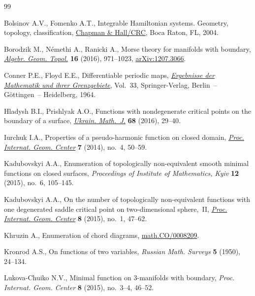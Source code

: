 \begin{thebibliography}{99}
\footnotesize\itemsep=0pt

Bolsinov A.V., Fomenko A.T., Integrable {H}amiltonian systems. Geometry,
 topology, classif\/ication, \href{https://doi.org/10.1201/9780203643426}{Chapman \& Hall/CRC}, Boca Raton, FL, 2004.

Borodzik M., N\'emethi A., Ranicki A., Morse theory for manifolds with
 boundary, \href{https://doi.org/10.2140/agt.2016.16.971}{\textit{Algebr. Geom. Topol.}} \textbf{16} (2016), 971--1023,
 \href{https://arxiv.org/abs/1207.3066}{arXiv:1207.3066}.

Conner P.E., Floyd E.E., Dif\/ferentiable periodic maps, \href{https://doi.org/10.1007/978-3-662-41633-4}{\textit{Ergebnisse der
 Mathematik und ihrer Grenzgebiete}}, Vol.~33, Springer-Verlag, Berlin~--
 G\"ottingen~-- Heidelberg, 1964.

Hladysh B.I., Prishlyak A.O., Functions with nondegenerate critical points on
 the boundary of a surface, \href{https://doi.org/10.1007/s11253-016-1206-5}{\textit{Ukrain. Math.~J.}} \textbf{68} (2016),
 29--40.

Iurchuk I.A., Properties of a pseudo-harmonic function on closed domain,
 \href{https://doi.org/10.15673/2072-9812.4/2014.41445}{\textit{Proc. Internat. Geom. Center}} \textbf{7} (2014), no.~4, 50--59.

Kadubovskyi A.A., Enumeration of topologically non-equivalent smooth minimal
 functions on closed surfaces, \textit{Proceedings of Institute of Mathematics, Kyiv} \textbf{12} (2015), no.~6, 105--145.

Kadubovskyi A.A., On the number of topologically non-equivalent functions with
 one degenerated saddle critical point on two-dimensional sphere,~II,
 \href{https://doi.org/10.15673/2072-9812.1/2015.50155}{\textit{Proc. Internat. Geom. Center}} \textbf{8} (2015), no.~1, 47--62.

Khruzin A., Enumeration of chord diagrams, \href{https://arxiv.org/abs/math.CO/0008209}{math.CO/0008209}.

Kronrod A.S., On functions of two variables, \textit{Russian Math. Surveys}
 \textbf{5} (1950), 24--134.

Lukova-Chuiko N.V., Minimal function on 3-manifolds with boundary,
 \textit{Proc. Internat. Geom. Center} \textbf{8} (2015), no.~3--4, 46--52.


\end{thebibliography}
